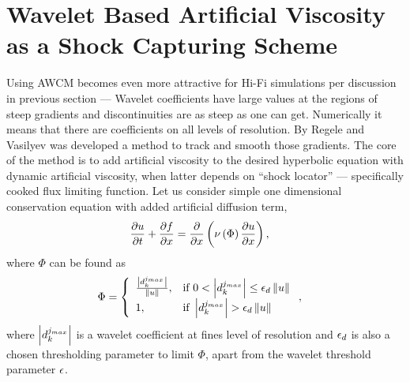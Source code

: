 \section{Wavelet Based Artificial Viscosity as a Shock Capturing Scheme}
Using AWCM becomes even more attractive for Hi-Fi simulations per discussion in previous section --- Wavelet coefficients have large values at the regions of steep gradients and discontinuities are as steep as one can get. Numerically it means that there are coefficients on all levels of resolution. By Regele and Vasilyev \cite{lib:RegVas} was developed a method to track and smooth those gradients. The core of the method is to add artificial viscosity to the desired hyperbolic equation with dynamic artificial viscosity, when latter depends on ``shock locator'' --- specifically cooked flux limiting function. Let us consider simple one dimensional conservation equation with added artificial diffusion term,
\begin{align}
\frac {\partial u}{\partial t} + \frac {\partial f}{\partial x} &= \frac {\partial} {\partial x} \left(\nu \left(\Phi\right) \frac {\partial u}{\partial x}\right),
\end{align}
where $\Phi$ can be found as
\begin{align}
\Phi &= \left\{\begin{array}{ll}
\frac {\left|d_k^{j_{max}}\right|}{\left\|u\right\|}, & \textmd{if } 0 < \left|d_k^{j_{max}}\right| \le \epsilon_d \left\|u\right\| \\
1, & \textmd{if } \left|d_k^{j_{max}}\right| > \epsilon_d \left\|u\right\|
\end{array}\right.,
\end{align}
where $\left|d_k^{j_{max}}\right|$ is a wavelet coefficient at fines level of resolution and $\epsilon_d$ is also a chosen thresholding parameter to limit $\Phi$, apart from the wavelet threshold parameter $\epsilon$.

